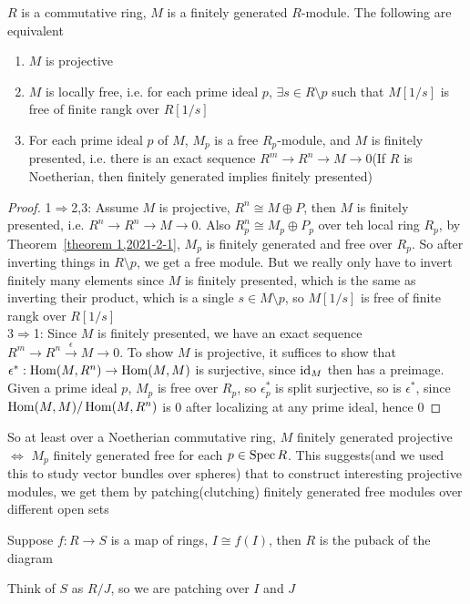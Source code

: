 \documentclass[main]{subfiles}
\begin{document}
\begin{theorem}\label{theorem 1,2021-2-1}
$R$ is a commutative ring, $M$ is a finitely generated $R$-module. The following are equivalent
\begin{enumerate}
\item $M$ is projective
\item $M$ is locally free, i.e. for each prime ideal $p$, $\exists s\in R\setminus p$ such that $M[1/s]$ is free of finite rangk over $R[1/s]$
\item For each prime ideal $p$ of $M$, $M_p$ is a free $R_p$-module, and $M$ is finitely presented, i.e. there is an exact sequence $R^m\to R^n\to M\to0$(If $R$ is Noetherian, then finitely generated implies finitely presented)
\end{enumerate}
\end{theorem}

\begin{proof}
1$\Rightarrow$2,3: Assume $M$ is projective, $R^n\cong M\oplus P$, then $M$ is finitely presented, i.e. $R^n\to R^n\to M\to0$. Also $R_p^n\cong M_p\oplus P_p$ over teh local ring $R_p$, by Theorem~\ref{theorem 1,2021-2-1}, $M_p$ is finitely generated and free over $R_p$. So after inverting things in $R\setminus p$, we get a free module. But we really only have to invert finitely many elements since $M$ is finitely presented, which is the same as inverting their product, which is a single $s\in M\setminus p$, so $M[1/s]$ is free of finite rangk over $R[1/s]$ \\
3$\Rightarrow$1: Since $M$ is finitely presented, we have an exact sequence $R^m\to R^n\xrightarrow\epsilon M\to0$. To show $M$ is projective, it suffices to show that $\epsilon^*:\operatorname{Hom}(M,R^n)\to\operatorname{Hom}(M,M)$ is surjective, since $\operatorname{id}_M$ then has a preimage. Given a prime ideal $p$, $M_p$ is free over $R_p$, so $\epsilon_p^*$ is split surjective, so is $\epsilon^*$, since $\operatorname{Hom}(M,M)/\operatorname{Hom}(M,R^n)$ is 0 after localizing at any prime ideal, hence 0
\end{proof}

So at least over a Noetherian commutative ring, $M$ finitely generated projective  $\iff$ $M_p$ finitely generated free for each $p\in\operatorname{Spec} R$. This suggests(and we used this to study vector bundles over spheres) that to construct interesting projective modules, we get them by patching(clutching) finitely generated free modules over different open sets

\begin{example}
Suppose $f:R\to S$ is a map of rings, $I\cong f(I)$, then $R$ is the puback of the diagram
\begin{center}
\end{center}
Think of $S$ as $R/J$, so we are patching over $I$ and $J$
\end{example}
\end{document}
